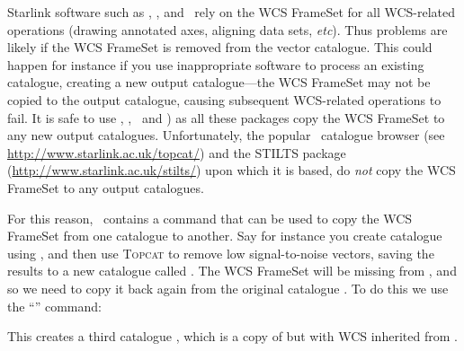 Starlink software such as \polpack, \Kappa, and \gaia\ rely on the WCS
FrameSet for all WCS-related operations (drawing annotated axes, aligning
data sets, \emph{etc}). Thus problems are likely if the WCS FrameSet is
removed from the vector catalogue. This could happen for instance if you
use inappropriate software to process an existing catalogue, creating a
new output catalogue---the WCS FrameSet may not be copied to the output
catalogue, causing subsequent WCS-related operations to fail. It is safe
to use \POLPACK, \KAPPA, \GAIA\ and ) as
all these packages copy the WCS FrameSet to any new output catalogues.
Unfortunately, the popular \topcat\ catalogue browser (see
\url{http://www.starlink.ac.uk/topcat/}) and the STILTS package
(\url{http://www.starlink.ac.uk/stilts/}) upon which it is based, do
\emph{not} copy the WCS FrameSet to any output catalogues.

For this reason, \POLPACK\ contains a command that can be used to copy the
WCS FrameSet from one catalogue to another.  Say for instance you create
catalogue  using , and then use \textsc{Topcat} to remove
low signal-to-noise vectors, saving the results to a new catalogue called
. The WCS FrameSet will be missing from ,
and so we need to copy it back again from the original catalogue .
To do this we use the ``'' command:

\begin{terminalv}
\end{terminalv}

This creates a third catalogue , which is a copy of
 but with WCS inherited from .






